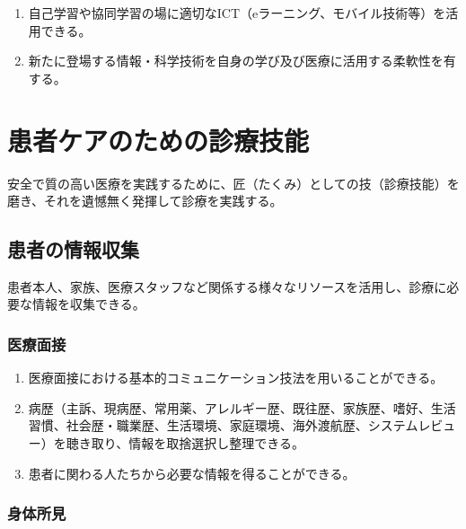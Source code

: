 \begin{enumerate}
\def\labelenumi{\arabic{enumi}.}
\tightlist
\item
  自己学習や協同学習の場に適切なICT（eラーニング、モバイル技術等）を活用できる。
\item
  新たに登場する情報・科学技術を自身の学び及び医療に活用する柔軟性を有する。
\end{enumerate}

\newpage

\hypertarget{ux60a3ux8005ux30b1ux30a2ux306eux305fux3081ux306eux8a3aux7642ux6280ux80fd}{%
\section{患者ケアのための診療技能}\label{ux60a3ux8005ux30b1ux30a2ux306eux305fux3081ux306eux8a3aux7642ux6280ux80fd}}

安全で質の高い医療を実践するために、匠（たくみ）としての技（診療技能）を磨き、それを遺憾無く発揮して診療を実践する。

\hypertarget{ux60a3ux8005ux306eux60c5ux5831ux53ceux96c6}{%
\subsection{患者の情報収集}\label{ux60a3ux8005ux306eux60c5ux5831ux53ceux96c6}}

患者本人、家族、医療スタッフなど関係する様々なリソースを活用し、診療に必要な情報を収集できる。

\hypertarget{ux533bux7642ux9762ux63a5}{%
\subsubsection{医療面接}\label{ux533bux7642ux9762ux63a5}}

\begin{enumerate}
\def\labelenumi{\arabic{enumi}.}
\tightlist
\item
  医療面接における基本的コミュニケーション技法を用いることができる。
\item
  病歴（主訴、現病歴、常用薬、アレルギー歴、既往歴、家族歴、嗜好、生活習慣、社会歴・職業歴、生活環境、家庭環境、海外渡航歴、システムレビュー）を聴き取り、情報を取捨選択し整理できる。
\item
  患者に関わる人たちから必要な情報を得ることができる。
\end{enumerate}

\hypertarget{ux8eabux4f53ux6240ux898b}{%
\subsubsection{身体所見}\label{ux8eabux4f53ux6240ux898b}}

